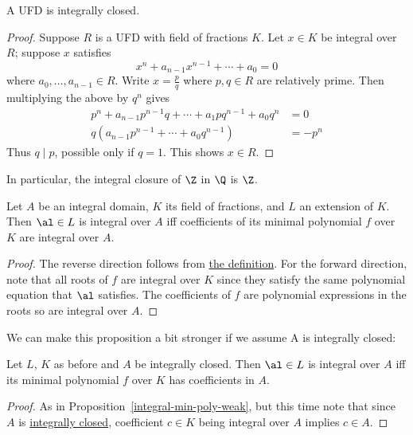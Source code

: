 \begin{thm}
A UFD is integrally closed.
\end{thm}
\begin{proof}
Suppose $R$ is a UFD with field of fractions $K$. Let $x\in K$ be integral over $R$; suppose $x$ satisfies
\[
x^n+a_{n-1}x^{n-1}+\cdots +a_0=0
\]
where $a_0,\ldots, a_{n-1}\in R$. Write $x=\frac pq$ where $p,q\in R$ are relatively prime. Then multiplying the above by $q^n$ gives
\begin{align*}
p^n+a_{n-1}p^{n-1}q+\cdots +a_1pq^{n-1} +a_0q^n&=0\\
q(a_{n-1}p^{n-1}+\cdots +a_0q^{n-1})&=-p^n
\end{align*}
Thus $q\mid p$, possible only if $q=1$. This shows $x\in R$.
\end{proof}

\noindent In particular, the integral closure of $\Z$ in $\Q$ is $\Z$.

\begin{pr}
Let $A$ be an integral domain, $K$ its field of fractions, and $L$ an extension of $K$. Then $\al\in L$ is integral over $A$ iff coefficients of its minimal polynomial $f$ over $K$ are integral over $A$.
\end{pr}
\begin{proof}
The reverse direction follows from \hyperref[integral]{the definition}.
For the forward direction, note that all roots of $f$ are integral over $K$ since they satisfy the same polynomial equation that $\al$ satisfies.
The coefficients of $f$ are polynomial expressions in the roots so are integral over $A$.
\end{proof}

\noindent We can make this proposition a bit stronger if we assume A is integrally closed:

\begin{pr}
Let $L$, $K$ as before and $A$ be integrally closed. Then $\al\in L$ is integral over $A$ iff its minimal polynomial $f$ over $K$ has coefficients in $A$.
\end{pr}
\begin{proof}
As in Proposition~\ref{integral-min-poly-weak}, but this time note that since $A$ is \hyperref[integrally-closed]{integrally closed}, coefficient $c \in K$ being integral over $A$ implies $c \in A$.
\end{proof}

